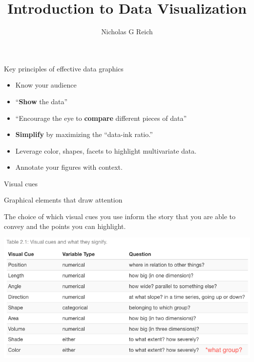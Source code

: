 \documentclass[table]{beamer}\usepackage[]{graphicx}\usepackage[]{color}
\title{Introduction to Data Visualization}
\author{Nicholas G Reich}
\begin{document}
\begin{frame}[plain]
	\titlepage
\end{frame}






\begin{frame}{Key principles of effective data graphics}

\begin{itemize}
    \item Know your audience
    \item ``{\bf Show} the data''
    \item ``Encourage the eye to {\bf compare} different pieces of data''
    \item {\bf Simplify} by maximizing the ``data-ink ratio.''
    \item Leverage color, shapes, facets to highlight multivariate data.
    \item Annotate your figures with context.
\end{itemize}

\end{frame}



\begin{frame}[fragile]{Visual cues}
\begin{block}{Graphical elements that draw attention}

The choice of which visual cues you use inform the story that you are able to convey and the points you can highlight.

\end{block}

\includegraphics[width=\textwidth]{figure-static/visual-cues.png}

\end{frame}
\end{document}
